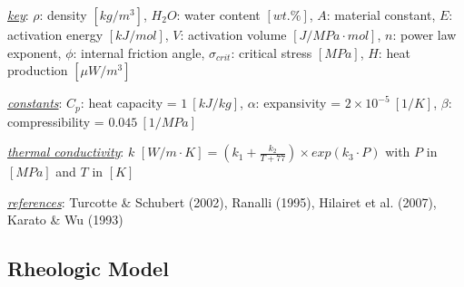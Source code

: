 \begin{landscape}
\begin{table}
{\begin{threeparttable}
\begin{tabular}[t]{lrrlrrrrrrrrlr}
\bottomrule
\end{tabular}
\begin{tablenotes}
\item \uline{\textit{key}}: $\rho$: density $[kg/m^3]$, $H_2O$: water content $[wt.\%]$, $A$: material constant, $E$: activation energy $[kJ/mol]$, $V$: activation volume $[J/MPa\cdot mol]$, $n$: power law exponent, $\phi$: internal friction angle, $\sigma_{crit}$: critical stress $[MPa]$, $H$: heat production $[\mu W/m^3]$
\item \uline{\textit{constants}}: $C_p$: heat capacity = $1~[kJ/kg]$, $\alpha$: expansivity = $2\times 10^{-5}~[1/K]$, $\beta$: compressibility = $0.045~[1/MPa]$
\item \uline{\textit{thermal conductivity}}: $k$ $[W/m \cdot K]=(k_1+\frac{k_2}{T+77})\times exp(k_3 \cdot P)$ with $P$ in $[MPa]$ and $T$ in $[K]$
\item \uline{\textit{references}}: Turcotte \& Schubert (2002), Ranalli (1995), Hilairet et al. (2007), Karato \& Wu (1993)
\end{tablenotes}
\end{threeparttable}}
\end{table}
\end{landscape}

\hypertarget{rheologicModel}{%
\subsection{Rheologic Model}\label{rheologicModel}}

